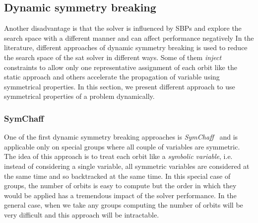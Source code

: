 % 


\subsection{Dynamic symmetry breaking}

Another disadvantage is that the solver is influenced by SBPs and explore the search space with a different 
manner and can affect performance negatively 
In the literature, different approaches of dynamic symmetry breaking is used to reduce the search space
of the sat solver in different ways. Some of them \textit{inject} constraints to allow only one representative assignment of each orbit like the static approach and others accelerate the propagation of variable using symmetrical properties. In this section, we present different approach to use symmetrical properties of a problem 
dynamically.

\subsubsection{SymChaff}
One of the first dynamic symmetry breaking approaches is \emph{SymChaff}~\cite{sabharwal2005symchaff}
and is applicable only on special groups where all couple of variables are symmetric.
The idea of this approach is to treat each orbit like a \emph{symbolic variable}, i.e. instead of considering a single
variable, all symmetric variables are considered at the same time and so backtracked at the same time.
In this special case of groups, the number of orbits is easy to compute but the order in which they would be
applied has a tremendous impact of the solver performance.
In the general case, when we take any groups computing the number of orbits will be very difficult and this approach
will be intractable.

